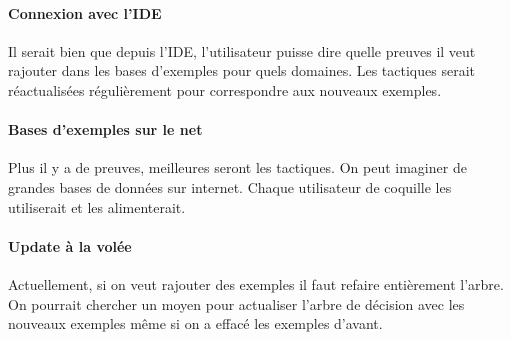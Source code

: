 \paragraph{Connexion avec l'IDE} Il serait bien que depuis l'IDE, l'utilisateur puisse dire quelle preuves il veut rajouter dans les bases d'exemples pour quels domaines. Les tactiques serait réactualisées régulièrement pour correspondre aux nouveaux exemples.

\paragraph{Bases d'exemples sur le net} Plus il y a de preuves, meilleures seront les tactiques. On peut imaginer de grandes bases de données sur internet. Chaque utilisateur de coquille les utiliserait et les alimenterait.

\paragraph{Update à la volée} Actuellement, si on veut rajouter des exemples il faut refaire entièrement l'arbre. On pourrait chercher un moyen pour actualiser l'arbre de décision avec les nouveaux exemples même si on a effacé les exemples d'avant.

